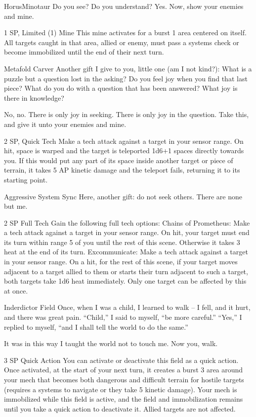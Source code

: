\begin{mech}{Horus}{Minotaur}
Do you see? Do you understand? Yes. Now, show your enemies and mine. 

1 SP, Limited (1)
Mine
This mine activates for a burst 1 area centered on itself. All targets caught in that area, allied or enemy, must pass a systems check or become immobilized until the end of their next turn.

Metafold Carver
Another gift I give to you, little one (am I not kind?): What is a puzzle but a question lost in the asking? Do you feel joy when you find that last piece? What do you do with a question that has been answered? What joy is there in knowledge? 

No, no. There is only joy in seeking. There is only joy in the question. Take this, and give it unto your enemies and mine.

2 SP, Quick Tech
Make a tech attack against a target in your sensor range. On hit, space is warped and the target is teleported 1d6+1 spaces directly towards you. If this would put any part of its space inside another target or piece of terrain, it takes 5 AP kinetic damage and the teleport fails, returning it to its starting point.

Aggressive System Sync
Here, another gift: do not seek others. There are none but me. 

2 SP
Full Tech
Gain the following full tech options:
Chains of Prometheus: Make a tech attack against a target in your sensor range. On hit, your target must end its turn within range 5 of you until the rest of this scene. Otherwise it takes 3 heat at the end of its turn.
Excommunicate: Make a tech attack against a target in your sensor range. On a hit, for the rest of this scene, if your target moves adjacent to a target allied to them or starts their turn adjacent to such a target, both targets take 1d6 heat immediately. Only one target can be affected by this at once.

Inderdictor Field
Once, when I was a child, I learned to walk  -- I fell, and it hurt, and there was great pain. “Child,” I said to myself, “be more careful.” “Yes,” I replied to myself, “and I shall tell the world to do the same.”

It was in this way I taught the world not to touch me. Now you, walk. 

3 SP
Quick Action
You can activate or deactivate this field as a quick action. Once activated, at the start of your next turn, it creates a burst 3 area around your mech that becomes both dangerous and difficult terrain for hostile targets (requires a systems to navigate or they take 5 kinetic damage). Your mech is immobilized while this field is active, and the field and immobilization remains until you take a quick action to deactivate it. Allied targets are not affected.


\end{mech}
